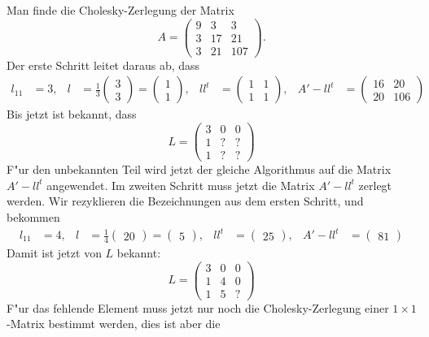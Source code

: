 \begin{beispiel}
Man finde die Cholesky-Zerlegung der Matrix
\[
A=\begin{pmatrix}
9&3&3\\
3&17&21\\
3&21&107
\end{pmatrix}.
\]
Der erste Schritt leitet daraus ab, dass
\begin{align*}
l_{11}&=3,&
l&=\frac13\begin{pmatrix}3\\3\end{pmatrix}=\begin{pmatrix}1\\1\end{pmatrix},&
ll^t&=\begin{pmatrix}1&1\\1&1\end{pmatrix},&
A'-ll^t&=\begin{pmatrix}16&20\\20&106\end{pmatrix}
\end{align*}
Bis jetzt ist bekannt, dass
\[
L=\begin{pmatrix}
3&0&0\\
1&?&?\\
1&?&?
\end{pmatrix}
\]
F"ur den unbekannten Teil wird jetzt der gleiche Algorithmus auf
die Matrix $A'-ll^t$ angewendet.
Im zweiten Schritt muss jetzt die Matrix $A'-ll^t$ zerlegt werden.
Wir rezyklieren die Bezeichnungen aus dem ersten Schritt, und
bekommen
\begin{align*}
l_{11}&=4,&
l&=\frac14\begin{pmatrix}20\end{pmatrix}=\begin{pmatrix}5\end{pmatrix},&
ll^t&=\begin{pmatrix}25\end{pmatrix},&
A'-ll^t&=\begin{pmatrix}81\end{pmatrix}
\end{align*}
Damit ist jetzt von $L$ bekannt:
\[
L=\begin{pmatrix}
3&0&0\\
1&4&0\\
1&5&?
\end{pmatrix}
\]
F"ur das fehlende Element muss jetzt nur noch die Cholesky-Zerlegung
einer $1\times 1$-Matrix bestimmt werden, dies ist aber die 

\end{beispiel}
